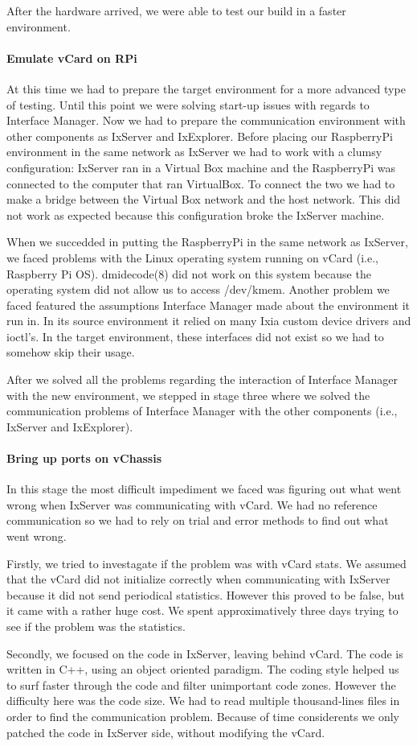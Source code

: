 After the hardware arrived, we were able to test our build in a faster
environment.

\paragraph{Emulate vCard on RPi}

At this time we had to prepare the target environment for a more advanced
type of testing. Until this point we were solving start-up issues with regards
to Interface Manager. Now we had to prepare the communication environment with
other components as IxServer and IxExplorer. Before placing our RaspberryPi
environment in the same network as IxServer we had to work with a clumsy
configuration: IxServer ran in a Virtual Box machine and the RaspberryPi was
connected to the computer that ran VirtualBox. To connect the two we had to make
a bridge between the Virtual Box network and the host network. This did not work
as expected because this configuration broke the IxServer machine.

When we succedded in putting the RaspberryPi in the same network as IxServer,
we faced problems with the Linux operating system running on vCard (i.e.,
Raspberry Pi OS). dmidecode(8) did not work on this system because the operating
system did not allow us to access /dev/kmem. Another problem we faced featured
the assumptions Interface Manager made about the environment it run in. In its
source environment it relied on many Ixia custom device drivers and ioctl's.
In the target environment, these interfaces did not exist so we had to somehow
skip their usage.

After we solved all the problems regarding the interaction of Interface Manager
with the new environment, we stepped in stage three where we solved the
communication problems of Interface Manager with the other components (i.e.,
IxServer and IxExplorer).

\paragraph{Bring up ports on vChassis}

In this stage the most difficult impediment we faced was figuring out what went
wrong when IxServer was communicating with vCard. We had no reference
communication so we had to rely on trial and error methods to find out what went
wrong.

Firstly, we tried to investagate if the problem was with vCard stats. We assumed
that the vCard did not initialize correctly when communicating with IxServer
because it did not send periodical statistics. However this proved to be false,
but it came with a rather huge cost. We spent approximatively three days trying
to see if the problem was the statistics.

Secondly, we focused on the code in IxServer, leaving behind vCard. The code is
written in C++, using an object oriented paradigm. The coding style helped us
to surf faster through the code and filter unimportant code zones. However the
difficulty here was the code size. We had to read multiple thousand-lines files
in order to find the communication problem. Because of time considerents we
only patched the code in IxServer side, without modifying the vCard.
